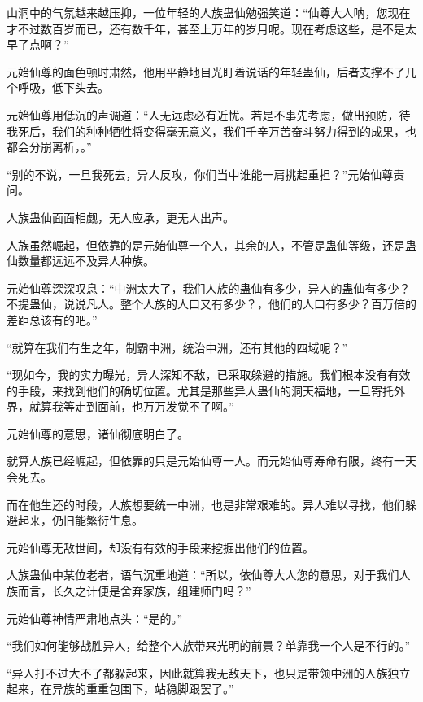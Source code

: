 
\begin{this_body}



山洞中的气氛越来越压抑，一位年轻的人族蛊仙勉强笑道：“仙尊大人呐，您现在才不过数百岁而已，还有数千年，甚至上万年的岁月呢。现在考虑这些，是不是太早了点啊？”

元始仙尊的面色顿时肃然，他用平静地目光盯着说话的年轻蛊仙，后者支撑不了几个呼吸，低下头去。

元始仙尊用低沉的声调道：“人无远虑必有近忧。若是不事先考虑，做出预防，待我死后，我们的种种牺牲将变得毫无意义，我们千辛万苦奋斗努力得到的成果，也都会分崩离析，。”

“别的不说，一旦我死去，异人反攻，你们当中谁能一肩挑起重担？”元始仙尊责问。

人族蛊仙面面相觑，无人应承，更无人出声。

人族虽然崛起，但依靠的是元始仙尊一个人，其余的人，不管是蛊仙等级，还是蛊仙数量都远远不及异人种族。

元始仙尊深深叹息：“中洲太大了，我们人族的蛊仙有多少，异人的蛊仙有多少？不提蛊仙，说说凡人。整个人族的人口又有多少？，他们的人口有多少？百万倍的差距总该有的吧。”

“就算在我们有生之年，制霸中洲，统治中洲，还有其他的四域呢？”

“现如今，我的实力曝光，异人深知不敌，已采取躲避的措施。我们根本没有有效的手段，来找到他们的确切位置。尤其是那些异人蛊仙的洞天福地，一旦寄托外界，就算我等走到面前，也万万发觉不了啊。”

元始仙尊的意思，诸仙彻底明白了。

就算人族已经崛起，但依靠的只是元始仙尊一人。而元始仙尊寿命有限，终有一天会死去。

而在他生还的时段，人族想要统一中洲，也是非常艰难的。异人难以寻找，他们躲避起来，仍旧能繁衍生息。

元始仙尊无敌世间，却没有有效的手段来挖掘出他们的位置。

人族蛊仙中某位老者，语气沉重地道：“所以，依仙尊大人您的意思，对于我们人族而言，长久之计便是舍弃家族，组建师门吗？”

元始仙尊神情严肃地点头：“是的。”

“我们如何能够战胜异人，给整个人族带来光明的前景？单靠我一个人是不行的。”

“异人打不过大不了都躲起来，因此就算我无敌天下，也只是带领中洲的人族独立起来，在异族的重重包围下，站稳脚跟罢了。”


\end{this_body}
